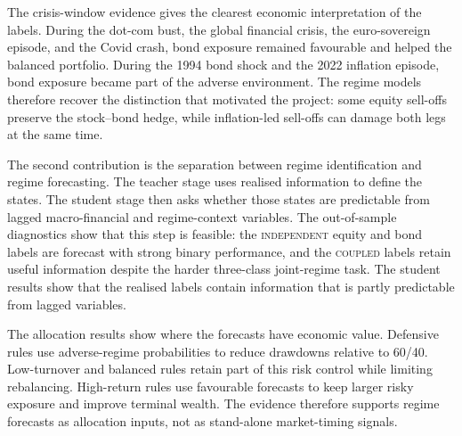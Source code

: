 \documentclass[10pt]{article}
\newcommand{\Acoup}{\textsc{coupled}}
\newcommand{\Bindep}{\textsc{independent}}
\begin{document}
The crisis-window evidence gives the clearest economic interpretation of the labels.
During the dot-com bust, the global financial crisis, the euro-sovereign episode, and the
Covid crash, bond exposure remained favourable and helped the balanced portfolio. During the
1994 bond shock and the 2022 inflation episode, bond exposure became part of the adverse
environment. The regime models therefore recover the distinction that motivated the project:
some equity sell-offs preserve the stock--bond hedge, while inflation-led sell-offs can
damage both legs at the same time.

The second contribution is the separation between regime identification and regime
forecasting. The teacher stage uses realised information to define the states. The student
stage then asks whether those states are predictable from lagged macro-financial and
regime-context variables. The out-of-sample diagnostics show that this step is feasible:
the \Bindep{} equity and bond labels are forecast with strong binary performance, and the
\Acoup{} labels retain useful information despite the harder three-class joint-regime task.
The student results show that the realised labels contain information that is partly
predictable from lagged variables.

The allocation results show where the forecasts have economic value. Defensive rules use
adverse-regime probabilities to reduce drawdowns relative to 60/40. Low-turnover and balanced
rules retain part of this risk control while limiting rebalancing. High-return rules use
favourable forecasts to keep larger risky exposure and improve terminal wealth. The evidence
therefore supports regime forecasts as allocation inputs, not as stand-alone market-timing
signals.
\appendix
\renewcommand{\thefigure}{\thesection.\arabic{figure}}
\renewcommand{\thetable}{\thesection.\arabic{table}}


\clearpage


\clearpage
\end{document}
